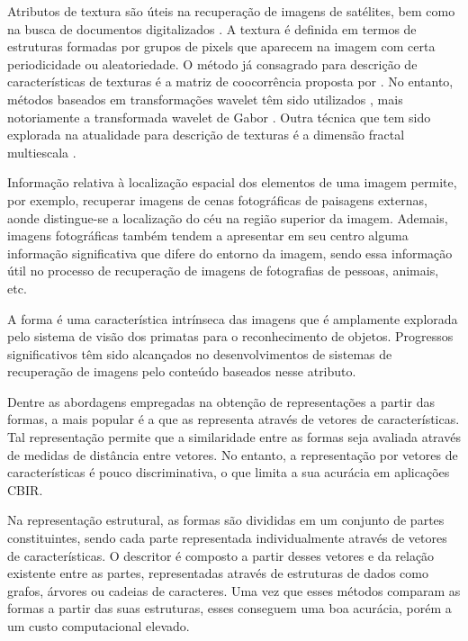 Atributos de textura são úteis na recuperação de imagens de satélites, bem como na busca de documentos digitalizados \cite{Smeulders:2000}. A textura é definida em termos de estruturas formadas por grupos de pixels que aparecem na imagem com certa periodicidade ou aleatoriedade. O método já consagrado para descrição de características de texturas é a matriz de coocorrência proposta por . No entanto, métodos baseados em transformações wavelet têm sido utilizados \cite{5376587}, mais notoriamente a transformada wavelet de Gabor \cite{531803}. Outra técnica que tem sido explorada na atualidade para descrição de texturas é a dimensão fractal multiescala \cite{Florindo:2013}. 

Informação relativa à localização espacial dos elementos de uma imagem permite, por exemplo, recuperar imagens de cenas fotográficas de paisagens externas, aonde distingue-se a localização do céu na região superior da imagem. Ademais, imagens fotográficas também tendem a apresentar em seu centro alguma informação significativa que difere do entorno da imagem, sendo essa informação útil no processo de recuperação de imagens de fotografias de pessoas, animais, etc.

A forma é uma característica intrínseca das imagens que é amplamente explorada pelo sistema de visão dos primatas para o reconhecimento de objetos. Progressos significativos têm sido alcançados no desenvolvimentos de sistemas de recuperação de imagens pelo conteúdo baseados nesse atributo.

Dentre as abordagens empregadas na obtenção de representações a partir das formas, a mais popular é a que as representa através de vetores de características. Tal representação permite que a similaridade entre as formas seja avaliada através de medidas de distância entre vetores. No entanto, a representação por vetores de características é pouco discriminativa, o que limita a sua acurácia em aplicações \ac{CBIR}.

Na representação estrutural, as formas são divididas em um conjunto de partes constituintes, sendo cada parte representada individualmente através de vetores de características. O descritor é composto a partir desses vetores e da relação existente entre as partes, representadas através de estruturas de dados como grafos, árvores ou cadeias de caracteres. Uma vez que esses métodos comparam as formas a partir das suas estruturas, esses conseguem uma boa acurácia, porém a um custo computacional elevado.



